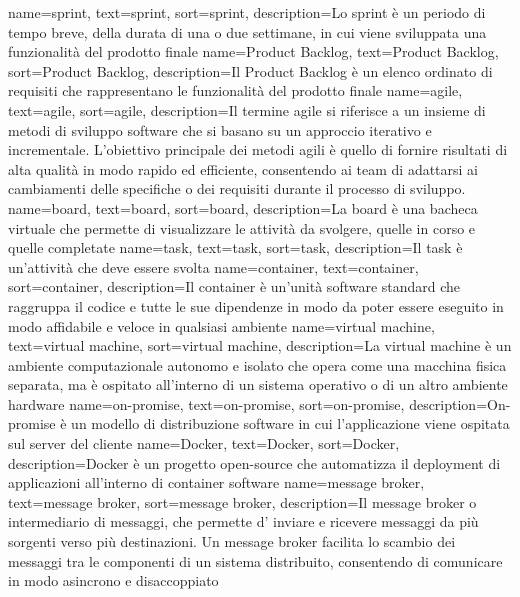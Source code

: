 {
    name={sprint},
    text=sprint,
    sort=sprint,
    description={Lo sprint è un periodo di tempo breve, della durata di una o due settimane, in cui viene sviluppata 
    una funzionalità del prodotto finale}
}
{
    name={Product Backlog},
    text=Product Backlog,
    sort=Product Backlog,
    description={Il Product Backlog è un elenco ordinato di requisiti che rappresentano le funzionalità del prodotto finale}
}
{
    name={agile},
    text=agile,
    sort=agile,
    description={Il termine agile si riferisce a un insieme di metodi di sviluppo software che si basano su un approccio iterativo e incrementale. 
    L'obiettivo principale dei metodi agili è quello di fornire risultati di alta qualità in modo rapido ed efficiente, consentendo ai team di adattarsi ai cambiamenti delle specifiche o dei requisiti durante il processo di sviluppo.}
}
{
    name={board},
    text=board,
    sort=board,
    description={La board è una bacheca virtuale che permette di visualizzare le attività da svolgere, quelle in corso e quelle completate}
}
{
    name={task},
    text=task,
    sort=task,
    description={Il task è un'attività che deve essere svolta}
}
{
    name={container},
    text=container,
    sort=container,
    description={Il container è un'unità software standard che raggruppa il codice e tutte le sue dipendenze in modo da poter essere eseguito in modo affidabile e veloce in qualsiasi ambiente}
}
{
    name={virtual machine},
    text=virtual machine,
    sort=virtual machine,
    description={La virtual machine è un ambiente computazionale autonomo e isolato che opera come una macchina fisica separata, ma è ospitato all'interno di un sistema operativo o di un altro ambiente hardware}
}
{
    name={on-promise},
    text=on-promise,
    sort=on-promise,
    description={On-promise è un modello di distribuzione software in cui l'applicazione viene ospitata sul server del cliente}
}
{
    name={Docker},
    text=Docker,
    sort=Docker,
    description={Docker è un progetto open-source che automatizza il deployment di applicazioni all'interno di container software}
}
{
    name={message broker},
    text=message broker,
    sort=message broker,
    description={Il message broker o intermediario di messaggi, che permette d' inviare e ricevere messaggi da più sorgenti verso più destinazioni. Un message broker facilita lo scambio dei messaggi 
    tra le componenti di un sistema distribuito, consentendo di comunicare in modo asincrono e disaccoppiato}
}
